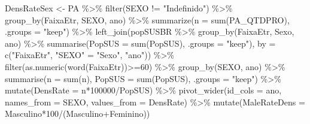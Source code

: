 \documentclass[
  letterpaper,
  DIV=11,
  numbers=noendperiod]{scrartcl}
\newenvironment{Shaded}{\begin{snugshade}}{\end{snugshade}}
\newcommand{\AttributeTok}[1]{\textcolor[rgb]{0.40,0.45,0.13}{#1}}
\newcommand{\DecValTok}[1]{\textcolor[rgb]{0.68,0.00,0.00}{#1}}
\newcommand{\FunctionTok}[1]{\textcolor[rgb]{0.28,0.35,0.67}{#1}}
\newcommand{\NormalTok}[1]{\textcolor[rgb]{0.00,0.23,0.31}{#1}}
\newcommand{\OtherTok}[1]{\textcolor[rgb]{0.00,0.23,0.31}{#1}}
\newcommand{\SpecialCharTok}[1]{\textcolor[rgb]{0.37,0.37,0.37}{#1}}
\newcommand{\StringTok}[1]{\textcolor[rgb]{0.13,0.47,0.30}{#1}}
\begin{document}
\begin{Shaded}
\begin{Highlighting}[]
\NormalTok{DensRateSex }\OtherTok{\textless{}{-}}\NormalTok{ PA }\SpecialCharTok{\%\textgreater{}\%} 
  \FunctionTok{filter}\NormalTok{(SEXO }\SpecialCharTok{!=} \StringTok{"Indefinido"}\NormalTok{) }\SpecialCharTok{\%\textgreater{}\%} 
  \FunctionTok{group\_by}\NormalTok{(FaixaEtr, SEXO, ano) }\SpecialCharTok{\%\textgreater{}\%}
  \FunctionTok{summarize}\NormalTok{(}\AttributeTok{n =} \FunctionTok{sum}\NormalTok{(PA\_QTDPRO), }\AttributeTok{.groups =} \StringTok{"keep"}\NormalTok{) }\SpecialCharTok{\%\textgreater{}\%} 
  \FunctionTok{left\_join}\NormalTok{(popSUSBR }\SpecialCharTok{\%\textgreater{}\%} \FunctionTok{group\_by}\NormalTok{(FaixaEtr, Sexo, ano) }\SpecialCharTok{\%\textgreater{}\%} \FunctionTok{summarise}\NormalTok{(}\AttributeTok{PopSUS =} \FunctionTok{sum}\NormalTok{(PopSUS), }\AttributeTok{.groups =} \StringTok{"keep"}\NormalTok{), }\AttributeTok{by =} \FunctionTok{c}\NormalTok{(}\StringTok{"FaixaEtr"}\NormalTok{, }\StringTok{"SEXO"} \OtherTok{=} \StringTok{"Sexo"}\NormalTok{, }\StringTok{"ano"}\NormalTok{)) }\SpecialCharTok{\%\textgreater{}\%} 
  \FunctionTok{filter}\NormalTok{(}\FunctionTok{as.numeric}\NormalTok{(}\FunctionTok{word}\NormalTok{(FaixaEtr))}\SpecialCharTok{\textgreater{}=}\DecValTok{60}\NormalTok{) }\SpecialCharTok{\%\textgreater{}\%} 
  \FunctionTok{group\_by}\NormalTok{(SEXO, ano) }\SpecialCharTok{\%\textgreater{}\%} 
  \FunctionTok{summarise}\NormalTok{(}\AttributeTok{n =} \FunctionTok{sum}\NormalTok{(n),}
            \AttributeTok{PopSUS =} \FunctionTok{sum}\NormalTok{(PopSUS), }\AttributeTok{.groups =} \StringTok{"keep"}\NormalTok{) }\SpecialCharTok{\%\textgreater{}\%} 
  \FunctionTok{mutate}\NormalTok{(}\AttributeTok{DensRate =}\NormalTok{ n}\SpecialCharTok{*}\DecValTok{100000}\SpecialCharTok{/}\NormalTok{PopSUS) }\SpecialCharTok{\%\textgreater{}\%} 
  \FunctionTok{pivot\_wider}\NormalTok{(}\AttributeTok{id\_cols =}\NormalTok{ ano, }\AttributeTok{names\_from =}\NormalTok{ SEXO, }\AttributeTok{values\_from =}\NormalTok{ DensRate) }\SpecialCharTok{\%\textgreater{}\%} 
  \FunctionTok{mutate}\NormalTok{(}\AttributeTok{MaleRateDens =}\NormalTok{ Masculino}\SpecialCharTok{*}\DecValTok{100}\SpecialCharTok{/}\NormalTok{(Masculino}\SpecialCharTok{+}\NormalTok{Feminino))}



\end{Highlighting}
\end{Shaded}
\end{document}

